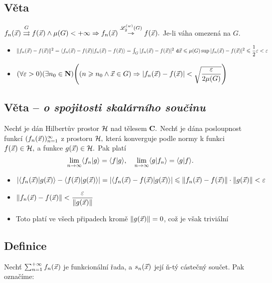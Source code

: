 \NoProof

\subsection{V\v eta}
$f_n({\vec{x}})\overset{G}{\rightrightarrows}f({\vec{x}}) \wedge \mu(G)<+\infty \Rightarrow f_n({\vec{x}})\overset{{\mathscr L}_2^{(w)}(G)}{\rightarrowtriangle}f({\vec{x}}).$ Je-li v\'aha omezen\'a na $G.$\\

\Proof
\begin{itemize}
\item $\|f_n({\vec{x}})-f({\vec{x}})\|^2=\langle f_n({\vec{x}})-f({\vec{x}})|f_n({\vec{x}})-f({\vec{x}})\rangle=\int_G |f_n({\vec{x}})-f({\vec{x}})|^2~\mathtt{d}{\vec{x}}\leqslant\mu(G)\sup |f_n({\vec{x}})-f({\vec{x}})|^2\leqslant \dfrac{1}{2}\varepsilon<\varepsilon$
\item $(\forall\varepsilon>0)(\exists n_0\in{\mathbf N})\Bigg((n\geqslant n_0 \wedge {\vec{x}}\in G)\Rightarrow |f_n({\vec{x}})-f({\vec{x}})|<\sqrt{\dfrac{\varepsilon}{2\mu(G)}}\Bigg)$
\end{itemize}

\subsection{V\v eta -- \emph{o spojitosti skal\'arn\'iho sou\v cinu}}\label{Hilbert_so_beautiful}

Nech\v t je d\'an Hilbert\r uv prostor ${\mathcal H}$ nad t\v elesem ${\mathbf C}.$  Nech\v t je d\'ana posloupnost funkc\'i $(f_n({\vec{x}}))_{n=1}^\infty$ z prostoru ${\mathcal H},$ kter\'a konverguje podle normy k funkci $f({\vec{x}})\in{\mathcal H},$ a funkce $g({\vec{x}})\in{\mathcal H}.$ Pak plat\'i
%
$$\lim_{n \rightarrow \infty} \langle f_n|g \rangle = \langle f|g \rangle, \quad \lim_{n \rightarrow \infty} \langle g|f_n \rangle = \langle g|f \rangle.$$

\Proof
\begin{itemize}
\item $|\langle f_n({\vec{x}})|g({\vec{x}}) \rangle - \langle f({\vec{x}})|g({\vec{x}}) \rangle| = |\langle f_n({\vec{x}})-f({\vec{x}})|g({\vec{x}}) \rangle| \leqslant \|f_n({\vec{x}})-f({\vec{x}})\|\cdot\|g({\vec{x}})\|<\varepsilon$
\item $\|f_n({\vec{x}})-f({\vec{x}})\|<\dfrac{\varepsilon}{\|g({\vec{x}})\|}$
\item Toto plat\'i ve v\v sech p\v ripadech krom\v e $\|g({\vec{x}})\|=0$, co\v z je v\v sak trivi\'aln\'i
\end{itemize}


\subsection{Definice}
Nech\v t $\sum_{n=1}^{+\infty}{f_n({\vec{x}})}$ je funkcion\'aln\'i \v rada, a $s_n({\vec{x}})$ jej\'i \v n-t\'y c\'aste\v cn\'y sou\v cet. Pak ozna\v c\'ime:


